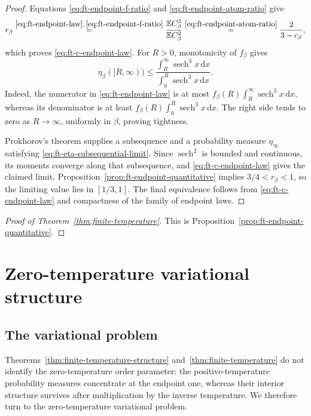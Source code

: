 \documentclass[10pt]{amsart}
\theoremstyle{definition}
\theoremstyle{remark}
\numberwithin{equation}{section}
\newcommand{\E}{\mathbb E}
\newcommand{\1}{\mathbf 1}
\newcommand{\sech}{\operatorname{sech}}
\newcommand{\dd}{\,\mathrm d}
\newcommand{\stackref}[2]{\stackrel{#2}{#1}}
\begin{document}
\begin{proof}
Equations \eqref{eq:ft-endpoint-f-ratio} and \eqref{eq:ft-endpoint-atom-ratio} give
\begin{equation*}
 r_\beta
 \stackref{=}{\eqref{eq:ft-endpoint-law},\,\eqref{eq:ft-endpoint-f-ratio}}
 \frac{\E C_\beta^3}{\E C_\beta^2}
 \stackref{=}{\eqref{eq:ft-endpoint-atom-ratio}}
 \frac2{3-c_\beta},
\end{equation*}
which proves \eqref{eq:ft-c-endpoint-law}.  For $R>0$, monotonicity of $f_\beta$ gives
\begin{equation}
 \eta_\beta([R,\infty))
 \leq
 \frac{\int_R^\infty\sech^3x\dd x}
      {\int_0^R\sech^3x\dd x}.
 \label{eq:ft-endpoint-law-tail}
\end{equation}
Indeed, the numerator in \eqref{eq:ft-endpoint-law} is at most $f_\beta(R)\int_R^\infty\sech^3x\dd x$, whereas its denominator is at least $f_\beta(R)\int_0^R\sech^3x\dd x$.  The right side tends to zero as $R\to\infty$, uniformly in $\beta$, proving tightness.

Prokhorov's theorem supplies a subsequence and a probability measure $\eta_\infty$ satisfying \eqref{eq:ft-eta-subsequential-limit}.  Since $\sech^2$ is bounded and continuous, its moments converge along that subsequence, and \eqref{eq:ft-c-endpoint-law} gives the claimed limit. Proposition~\ref{prop:ft-endpoint-quantitative} implies $3/4<r_\beta<1$, so the limiting value lies in $[1/3,1]$.  The final equivalence follows from \eqref{eq:ft-c-endpoint-law} and compactness of the family of endpoint laws.
\end{proof}

\begin{proof}[Proof of Theorem~\ref{thm:finite-temperature}]
This is Proposition~\ref{prop:ft-endpoint-quantitative}.
\end{proof}

\section{Zero-temperature variational structure}
\label{sec:zero-temperature-structure}

\subsection{The variational problem}
\label{sec:zt-variational}

Theorems~\ref{thm:finite-temperature-structure} and~\ref{thm:finite-temperature} do not identify the zero-temperature order parameter: the positive-temperature probability measures concentrate at the endpoint one, whereas their interior structure survives after multiplication by the inverse temperature. We therefore turn to the zero-temperature variational problem.
\end{document}
